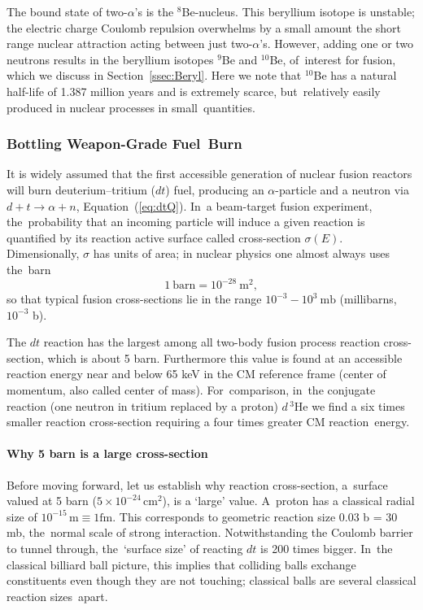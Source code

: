 \documentclass[particles,article,accept,pdftex,moreauthors]{Definitions/mdpi}
\begin{document}
The bound state of two-$\alpha$'s is the ${}^8$Be-nucleus. This beryllium isotope is unstable; the electric charge Coulomb repulsion overwhelms by a small amount the short range nuclear attraction acting between just two-$\alpha$'s. However, adding one or two neutrons results in the beryllium isotopes ${}^9$Be and ${}^{10}$Be, of~interest for fusion, which we discuss in Section~\ref{ssec:Beryl}. Here we note that ${}^{10}$Be has a natural half-life of 1.387 million years and is extremely scarce, but~relatively easily produced in nuclear processes in small~quantities.

\subsubsection{Bottling Weapon-Grade Fuel~Burn}\label{sssec:bottleHBomb}
It is widely assumed that the first accessible generation of nuclear fusion reactors will burn deuterium--tritium ($dt$) fuel, producing an $\alpha$-particle and a neutron via $d+t\to \alpha +n$, Equation~(\ref{eq:dtQ}). In~a beam-target fusion experiment, the~probability that an incoming particle will induce a given reaction is quantified by its reaction active surface called cross-section $\sigma(E)$. Dimensionally, $\sigma$ has units of area; in nuclear physics one almost always uses the~barn
\[
1\ \mathrm{barn} = 10^{-28}\ \mathrm{m}^2,
\]
so that typical fusion cross-sections lie in the range $10^{-3}-10^3\ \mathrm{mb}$ (millibarns, $10^{-3}$ b).

The $dt$ reaction has the largest among all two-body fusion process reaction cross-section, which is about 5 barn. Furthermore this value is found at an accessible reaction energy near and below 65 keV in the CM reference frame (center of momentum, also called center of mass). For~comparison, in~the conjugate reaction (one neutron in tritium replaced by a proton) $d\,{}^{3}\mathrm{He}$ we find a six times smaller reaction cross-section requiring a four times greater CM reaction~energy.

\vspace{-6pt}\paragraph*{\bf Why 5 barn is a large cross-section}
Before moving forward, let us establish why reaction cross-section, a~surface valued at 5 barn ($5\times 10^{-24}\,\mathrm{cm}^2$), is a `large' value. A~proton has a classical radial size of \mbox{$10^{-15}\,\mathrm{m}\equiv 1\mathrm{fm}$.} This corresponds to geometric reaction size 0.03 b = 30 mb, the~normal scale of strong interaction. Notwithstanding the Coulomb barrier to tunnel through, the~`surface size' of reacting $dt$ is 200 times bigger. In~the classical billiard ball picture, this implies that colliding balls exchange constituents even though they are not touching; classical balls are several classical reaction sizes~apart. 
\end{document}
